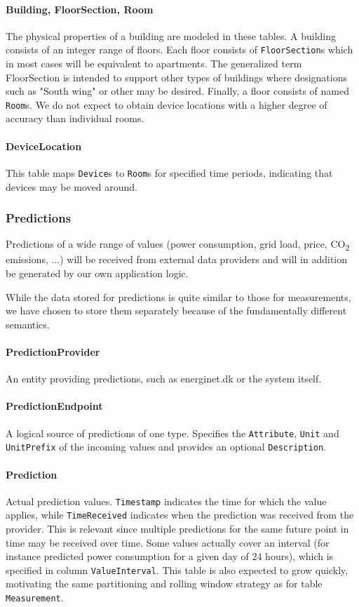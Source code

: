 \paragraph{Building, FloorSection, Room}
The physical properties of a building are modeled in these tables. A building consists of an integer range of floors. Each floor consists of \texttt{FloorSection}s which in most cases will be equivalent to apartments. The generalized term FloorSection is intended to support other types of buildings where designations such as "South wing" or other may be desired. Finally, a floor consists of named \texttt{Room}s. We do not expect to obtain device locations with a higher degree of accuracy than individual rooms.

\paragraph{DeviceLocation} This table maps \texttt{Device}s to \texttt{Room}s for specified time periods, indicating that devices may be moved around.

\subsubsection{Predictions}
Predictions of a wide range of values (power consumption, grid load, price, CO\textsubscript{2} emissions, ...) will be received from external data providers and will in addition be generated by our own application logic. 

While the data stored for predictions is quite similar to those for measurements, we have chosen to store them separately because of the fundamentally different semantics.

\paragraph{PredictionProvider}
An entity providing predictions, such as energinet.dk or the system itself.

\paragraph{PredictionEndpoint} 
A logical source of predictions of one type. Specifies the \texttt{Attribute}, \texttt{Unit} and \texttt{UnitPrefix} of the incoming values and provides an optional \texttt{Description}.

\paragraph{Prediction}
Actual prediction values. \texttt{Timestamp} indicates the time for which the value applies, while \texttt{TimeReceived} indicates when the prediction was received from the provider. This is relevant since multiple predictions for the same future point in time may be received over time. Some values actually cover an interval (for instance predicted power consumption for a given day of 24 hours), which is specified in column \texttt{ValueInterval}.
This table is also expected to grow quickly, motivating the same partitioning and rolling window strategy as for table \texttt{Measurement}.

